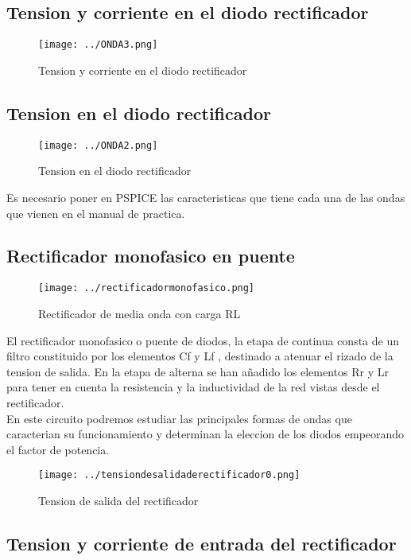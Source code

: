 \documentclass[11pt,a4paper]{article}
\begin{document}
\subsection{Tension y corriente en el diodo rectificador}

\begin{figure}[h]
\centering
\texttt{[image: ../ONDA3.png]} 
\caption{Tension y corriente en el diodo rectificador}
\end{figure}

\subsection{Tension en el diodo rectificador}

\begin{figure}[h]
\centering
\texttt{[image: ../ONDA2.png]}  
\caption{Tension en el diodo rectificador}
\end{figure}

Es necesario poner en PSPICE las caracteristicas que tiene cada una de las ondas que vienen en el manual de practica.

\subsection{Rectificador monofasico en puente}

\begin{figure}[h]
\centering
\texttt{[image: ../rectificadormonofasico.png]}  
\caption{Rectificador de media onda con carga RL}
\end{figure}


El rectificador monofasico o puente de diodos, la etapa de continua consta de un filtro constituido por los elementos Cf y Lf , destinado a atenuar el rizado de la tension de salida. En la etapa de alterna se han añadido los elementos Rr y Lr para tener en cuenta la resistencia y la inductividad de la red vistas desde el rectificador.\\
En este circuito podremos estudiar las principales formas de ondas que caracterian su funcionamiento y determinan la eleccion de los diodos empeorando el factor de potencia.

\begin{figure}[h]
\centering
\texttt{[image: ../tensiondesalidaderectificador0.png]} 
\caption{Tension de salida del rectificador}
\end{figure}

\subsection{Tension y corriente de entrada del rectificador}
\end{document}
